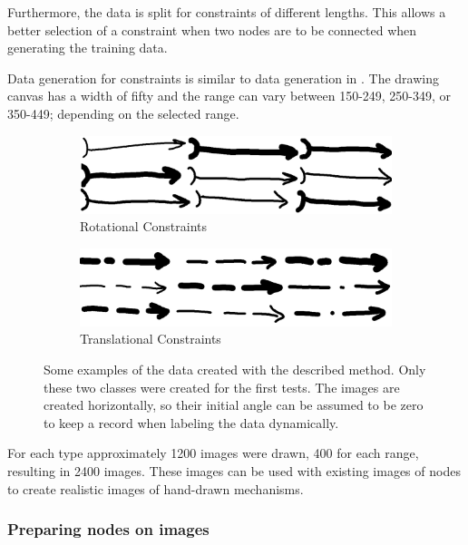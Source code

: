 Furthermore, the data is split for constraints of different lengths.
This allows a better selection of a constraint when two nodes are to be connected when generating the training data.

Data generation for constraints is similar to data generation in \cite{Lawrence2020}.
The drawing canvas has a width of fifty and the range can vary between 150-249, 250-349, or 350-449; depending on the selected range.

\begin{figure}
    \centering
    \begin{subfigure}[b]{0.45\textwidth}
        \includegraphics[width=\textwidth]{images/rs.png}
        \caption{Rotational Constraints}
        \label{fig:rotational_constraints}
    \end{subfigure}
    \begin{subfigure}[b]{0.45\textwidth}
        \includegraphics[width=\textwidth]{images/ts.png}
        \caption{Translational Constraints}
        \label{fig:translational_constraints}
    \end{subfigure}
    \caption[Examples of constraint detector training data]{Some examples of the data created with the described method. Only these two classes were created for the first tests. The images are created horizontally, so their initial angle can be assumed to be zero to keep a record when labeling the data dynamically. }
    \label{fig:constraint_data}
\end{figure}

For each type approximately 1200 images were drawn, 400 for each range, resulting in 2400 images. %
These images can be used with existing images of nodes to create realistic images of hand-drawn mechanisms.

\subsubsection{Preparing nodes on images}

